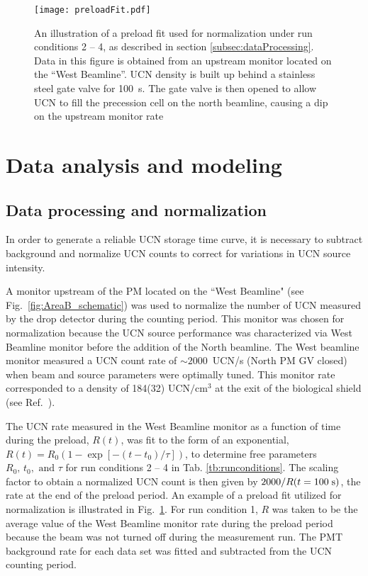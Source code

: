 \begin{figure}[htp]
    \centering
    \texttt{[image: preloadFit.pdf]}
    \caption[An illustration of a preload fit used for normalization under run conditions 2 -- 4, as described in section \ref{subsec:dataProcessing}.]
    {An illustration of a preload fit used for normalization under run conditions 2 -- 4, as described in section \ref{subsec:dataProcessing}. Data in this figure is obtained from an upstream monitor located on the ``West Beamline''. UCN density is built up behind a stainless steel gate valve for \qty{100}{\s}. The gate valve is then opened to allow UCN to fill the precession cell on the north beamline, causing a dip on the upstream monitor rate}
    \label{fig:preloadFit}
\end{figure}


\section{\label{sec:analysis}Data analysis and modeling}

\subsection{\label{subsec:dataProcessing}Data processing and normalization}


In order to generate a reliable UCN storage time curve, it is necessary to subtract background and normalize UCN counts to correct for variations in UCN source intensity.

A monitor upstream of the PM located on the ``West Beamline" (see Fig.~\ref{fig:AreaB_schematic}) was used to normalize the number of UCN measured by the drop detector during the counting period. This monitor was chosen for normalization because the UCN source performance was characterized via West Beamline monitor before the addition of the North beamline. The West beamline monitor measured a UCN count rate of $\sim2000$~UCN/s (North PM GV closed) when beam and source parameters were optimally tuned. This monitor rate corresponded to a density of 184(32) UCN$/\text{cm}^3$ at the exit of the biological shield (see Ref.~\cite{ito_performance_2018}).

The UCN rate measured in the West Beamline monitor as a function of time during the preload, $R(t)$, was fit to the form of an exponential, $R(t) = R_0( 1-\exp[-(t-t_0) /\tau ] )$, to determine free parameters $R_0,\,t_0,\text{ and } \tau$ for run conditions 2 -- 4 in Tab. \ref{tb:runconditions}. The scaling factor to obtain a normalized UCN count is then given by $2000 / R(t=100\;{\rm s})$, the rate at the end of the preload period. An example of a preload fit utilized for normalization is illustrated in Fig.~\ref{fig:preloadFit}. For run condition 1, $R$ was taken to be the average value of the West Beamline monitor rate during the preload period because the beam was not turned off during the measurement run. The PMT background rate for each data set was fitted and subtracted from the UCN counting period.

